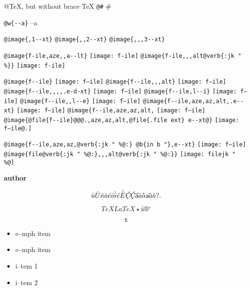 \documentclass{book}
\renewcommand{\_}{\Texinfounderscore\discretionary{}{}{}}
\renewcommand{\includegraphics}[1]{\fbox{FIG \detokenize{#1}}}
\begin{document}
\begin{titlepage}
@TeX, but without brace \TeX{}
\texttt{@\#} \#

\texttt{@w\{{-}{-}a\}} \hbox{--a}

\texttt{@image\{,1{-}{-}xt\}} 
\texttt{@image\{{,}{,}2{-}{-}xt\}} 
\texttt{@image\{{,}{,},3{-}{-}xt\}} 

\texttt{@image\{f-ile,aze{,}{,}a{-}{-}lt\}} \texttt{[image: f-ile]}
\texttt{@image\{f-ile{,}{,},alt@verb\{:jk \_" \%\@\}\}} \texttt{[image: f-ile]}

\texttt{@image\{f{-}{-}ile\}} \texttt{[image: f--ile]}
\texttt{@image\{f{-}{-}ile{,}{,},alt\}} \texttt{[image: f--ile]}
\texttt{@image\{f{-}{-}ile{,}{,}{,}{,}.e-d-xt\}} \texttt{[image: f--ile]}
\texttt{@image\{f{-}{-}ile,l{-}{-}i\}} \texttt{[image: f--ile]}
\texttt{@image\{f{-}{-}ile{,}{,}l{-}{-}e\}} \texttt{[image: f--ile]}
\texttt{@image\{f{-}{-}ile,aze,az,alt,.e{-}{-}xt\}} \texttt{[image: f--ile]}
\texttt{@image\{f{-}{-}ile,aze,az,alt,} \texttt{[image: f--ile]}
\texttt{@image\{@file\{f{-}{-}ile\}@@@.,aze,az,alt,@file\{.file ext\}\ e{-}{-}xt@\}} \texttt{[image: f--ile@.]}

\texttt{@image\{f{-}{-}ile,aze,az,@verb\{:jk \_" \%@:\}\ @b\{in b "\},e{-}{-}xt\}} \texttt{[image: f--ile]}
\texttt{@image\{file@verb\{:jk \_" \%@:\}{,}{,},alt@verb\{:jk \_" \%@:\}\}} \texttt{[image: filejk \_" \\\%@]}


{\bfseries author}%

\[
\ddot{u} \ddot{U} \tilde{n} \hat{a} \acute{e} \bar{o} \grave{i} \acute{e} \grave{\bar{E}}
\textsl{\c{\'{C}}} \textsl{\c{\'{C}}} \textsl{\H{a}} \dot{a} \mathring{a} \textsl{\t{a}}
\breve{a} \check{a}
 ? .
\]

\[
TeX LaTeX \star{} \mathord{\text{\aa{}}} \circledR{} ^{\circ{}} 
\]

\[
\mathtt{t} 
\]

\begin{itemize}[label=\emph{}]
\item e--mph item
\end{itemize}

\begin{itemize}[label=\emph{} after emph]
\item e--mph item
\end{itemize}

\begin{itemize}[label=\textbullet{} a--n itemize line]
\item i--tem 1
\item i--tem 2
\end{itemize}


\end{titlepage}
\end{document}

